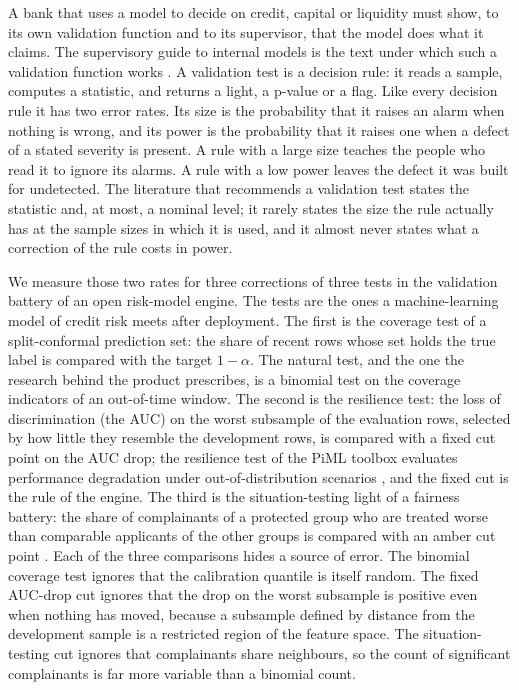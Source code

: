 A bank that uses a model to decide on credit, capital or liquidity must show, to its own validation function and to its supervisor, that the model does what it claims. The supervisory guide to internal models is the text under which such a validation function works \citep{ecb2025}. A validation test is a decision rule: it reads a sample, computes a statistic, and returns a light, a p-value or a flag. Like every decision rule it has two error rates. Its size is the probability that it raises an alarm when nothing is wrong, and its power is the probability that it raises one when a defect of a stated severity is present. A rule with a large size teaches the people who read it to ignore its alarms. A rule with a low power leaves the defect it was built for undetected. The literature that recommends a validation test states the statistic and, at most, a nominal level; it rarely states the size the rule actually has at the sample sizes in which it is used, and it almost never states what a correction of the rule costs in power.

We measure those two rates for three corrections of three tests in the validation battery of an open risk-model engine. The tests are the ones a machine-learning model of credit risk meets after deployment. The first is the coverage test of a split-conformal prediction set: the share of recent rows whose set holds the true label is compared with the target $1-\alpha$. The natural test, and the one the research behind the product prescribes, is a binomial test on the coverage indicators of an out-of-time window. The second is the resilience test: the loss of discrimination (the AUC) on the worst subsample of the evaluation rows, selected by how little they resemble the development rows, is compared with a fixed cut point on the AUC drop; the resilience test of the PiML toolbox evaluates performance degradation under out-of-distribution scenarios \citep{sudjianto2023}, and the fixed cut is the rule of the engine. The third is the situation-testing light of a fairness battery: the share of complainants of a protected group who are treated worse than comparable applicants of the other groups is compared with an amber cut point \citep{luong2011,alvarez2025}. Each of the three comparisons hides a source of error. The binomial coverage test ignores that the calibration quantile is itself random. The fixed AUC-drop cut ignores that the drop on the worst subsample is positive even when nothing has moved, because a subsample defined by distance from the development sample is a restricted region of the feature space. The situation-testing cut ignores that complainants share neighbours, so the count of significant complainants is far more variable than a binomial count.

